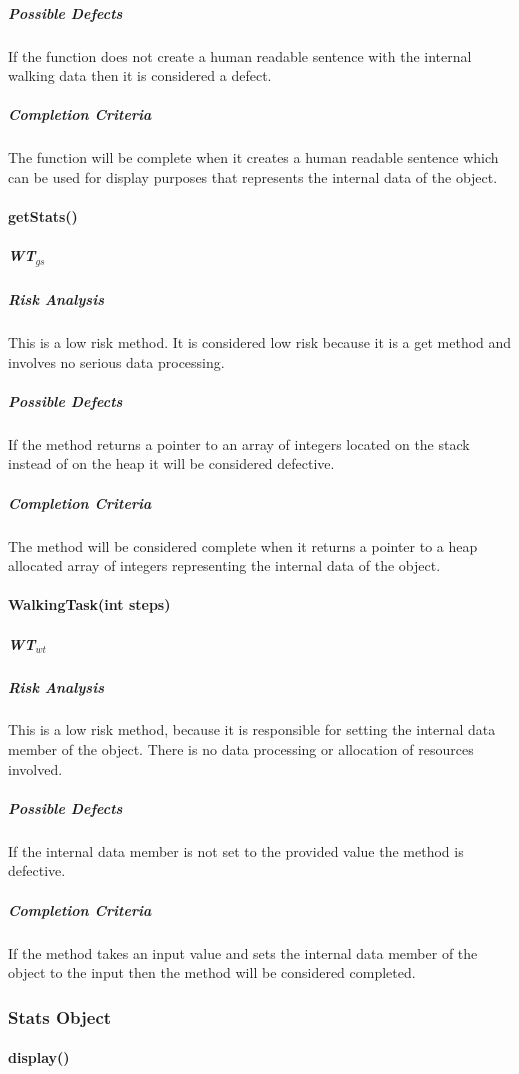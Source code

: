 \documentclass{article}
\begin{document}
\subparagraph{Possible Defects}
If the function does not create a human readable sentence with the internal walking data then it is considered a defect.

\subparagraph{Completion Criteria}
The function will be complete when it creates a human readable sentence which can be used for display purposes that represents the internal data of the object.

\paragraph{getStats()}
\subparagraph{WT$_{gs}$}

\subparagraph{Risk Analysis}
This is a low risk method. It is considered low risk because it is a get method and involves no serious data processing.

\subparagraph{Possible Defects}
If the method returns a pointer to an array of integers located on the stack instead of on the heap it will be considered defective.

\subparagraph{Completion Criteria}
The method will be considered complete when it returns a pointer to a heap allocated array of integers representing the internal data of the object.

\paragraph{WalkingTask(int steps)}
\subparagraph{WT$_{wt}$}

\subparagraph{Risk Analysis}
This is a low risk method, because it is responsible for setting the internal data member of the object. There is no data processing or allocation of resources involved.

\subparagraph{Possible Defects}
If the internal data member is not set to the provided value the method is defective.

\subparagraph{Completion Criteria}
If the method takes an input value and sets the internal data member of the object to the input then the method will be considered completed.

\subsubsection{Stats Object}

\paragraph{display()}
\end{document}

